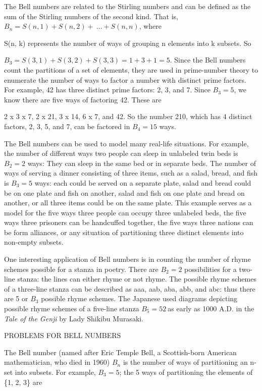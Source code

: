 The Bell numbers are related to the Stirling numbers and can be defined
as the sum of the Stirling numbers of the second kind. That is,
\(B_{n} = S\left( n,1 \right) + S\left( n,2 \right) + \ \ldots + S(n,n)\),
where

S(n, k) represents the number of ways of grouping n elements into k
subsets. So

\(B_{3} = S\left( 3,1 \right) + S\left( 3,2 \right) + S\left( 3,3 \right) = 1 + 3 + 1 = 5.\)
Since the Bell numbers count the partitions of a set of elements, they
are used in prime-number theory to enumerate the number of ways to
factor a number with distinct prime factors. For example, 42 has three
distinct prime factors: 2, 3, and 7. Since \(B_{3} = 5\), we know there
are five ways of factoring 42. These are

2 x 3 x 7, 2 x 21, 3 x 14, 6 x 7, and 42. So the number 210, which has 4
distinct factors, 2, 3, 5, and 7, can be factored in \(B_{4} = 15\)
ways.

The Bell numbers can be used to model many real-life situations. For
example, the number of different ways two people can sleep in unlabeled
twin beds is \(B_{2} = 2\) ways: They can sleep in the same bed or in
separate beds. The number of ways of serving a dinner consisting of
three items, such as a salad, bread, and fish is \(B_{3} = 5\) ways:
each could be served on a separate plate, salad and bread could be on
one plate and fish on another, salad and fish on one plate and bread on
another, or all three items could be on the same plate. This example
serves as a model for the five ways three people can occupy three
unlabeled beds, the five ways three prisoners can be handcuffed
together, the five ways three nations can be form alliances, or any
situation of partitioning three distinct elements into non-empty
subsets.

One interesting application of Bell numbers is in counting the number of
rhyme schemes possible for a stanza in poetry. There are \(B_{2} = 2\)
possibilities for a two-line stanza: the lines can either rhyme or not
rhyme. The possible rhyme schemes of a three-line stanza can be
described as aaa, aab, aba, abb, and abc: thus there are 5 or \(B_{3}\)
possible rhyme schemes. The Japanese used diagrams depicting possible
rhyme schemes of a five-line stanza \(B_{5} = 52\ \)as early as 1000
A.D. in the \emph{Tale of the Genji} by Lady Shikibu Murasaki.

PROBLEMS FOR BELL NUMBERS

The Bell number (named after Eric Temple Bell, a Scottish-born American
mathematician, who died in 1960) \(B_{n}\) is the number of ways of
partitioning an n-set into subsets. For example, \(B_{3} = 5\); the 5
ways of partitioning the elements of \{1, 2, 3\} are

